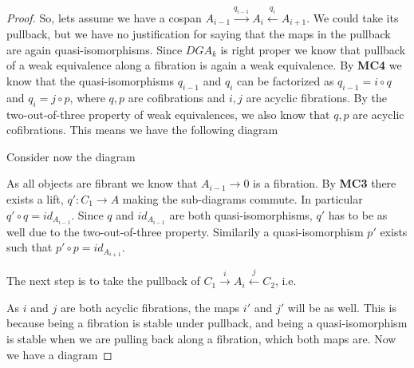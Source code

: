 \begin{proof}
So, lets assume we have a cospan $A_{i-1}\overset{q_{i-1}}\longrightarrow A_i\overset{q_i}\longleftarrow A_{i+1}$. We could take its pullback, but we have no justification for saying that the maps in the pullback are again quasi-isomorphisms. Since $DGA_k$ is right proper we know that pullback of a weak equivalence along a fibration is again a weak equivalence. By \textbf{MC4} we know that the quasi-isomorphisms $q_{i-1}$ and $q_i$ can be factorized as $q_{i-1} = i \circ q$ and $q_i = j\circ p$, where $q, p$ are cofibrations and $i, j$ are acyclic fibrations. By the two-out-of-three property of weak equivalences, we also know that $q, p$ are acyclic cofibrations. This means we have the following diagram
\begin{center}
\end{center}

Consider now the diagram
\begin{center}
\end{center}
As all objects are fibrant we know that $A_{i-1}\longrightarrow 0$ is a fibration. By \textbf{MC3}  there exists a lift, $q'\colon C_1\longrightarrow A$ making the sub-diagrams commute. In particular $q'\circ q = id_{A_{i-1}}$. Since $q$ and $id_{A_{i-1}}$ are both quasi-isomorphisms, $q'$ has to be as well due to the two-out-of-three property. Similarily a quasi-isomorphism $p'$ exists such that $p'\circ p = id_{A_{i+1}}$. 

The next step is to take the pullback of $C_1\overset{i}\rightarrow A_i\overset{j}\leftarrow C_2$, i.e.
\begin{center}
\end{center}
As $i$ and $j$ are both acyclic fibrations, the maps $i'$ and $j'$ will be as well. This is because being a fibration is stable under pullback, and being a quasi-isomorphism is stable when we are pulling back along a fibration, which both maps are. Now we have a diagram


\end{proof}
